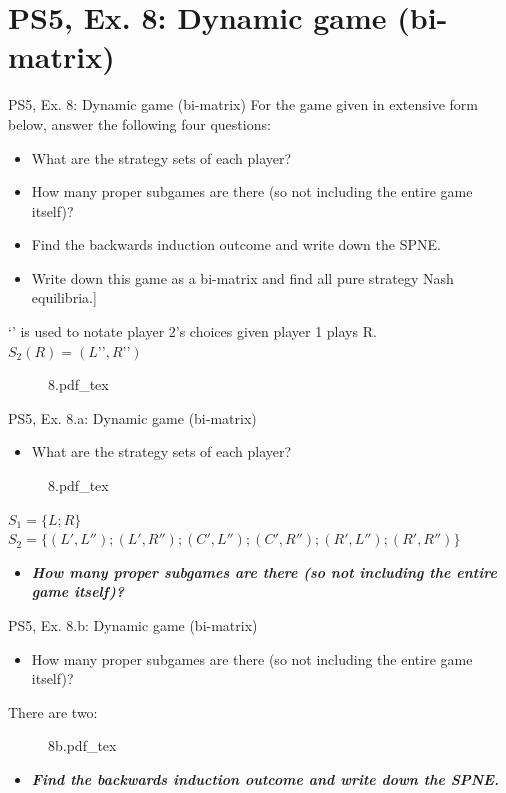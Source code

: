 \section{PS5, Ex. 8: Dynamic game (bi-matrix)}

\begin{frame}{PS5, Ex. 8: Dynamic game (bi-matrix)}
  For the game given in extensive form below, answer the following four questions:
  \begin{itemize}
    \item[(a)] What are the strategy sets of each player?
    \item[(b)] How many proper subgames are there (so not including the entire game itself)?
    \item[(c)] Find the backwards induction outcome and write down the SPNE.
    \item[(d)] Write down this game as a bi-matrix and find all pure strategy Nash equilibria.]
  \end{itemize}
    ‘’ is used to notate player 2’s choices given player 1 plays R. $S_2(R)=(L’’,R’’)$
  \begin{figure}[!h]
    \center
    \def\svgwidth{.8\columnwidth}
    {8.pdf_tex}
  \end{figure}
  \vfill\null
\end{frame}

\begin{frame}{PS5, Ex. 8.a: Dynamic game (bi-matrix)}
  \begin{itemize}
    \item[(a)] What are the strategy sets of each player?
  \end{itemize}
  \begin{figure}[!h]
    \center
    \def\svgwidth{.8\columnwidth}
    {8.pdf_tex}
  \end{figure}
  $S_1=\{L;R\}$\\
  $S_2=\{(L',L'');(L', R'');(C',L'');(C', R'');(R',L'');(R', R'')\}$
  \begin{itemize}
    \item[(b)] \textbf{\textit{How many proper subgames are there (so not including the entire game itself)?}}
  \end{itemize}
  \vfill\null
\end{frame}

\begin{frame}{PS5, Ex. 8.b: Dynamic game (bi-matrix)}
  \begin{itemize}
    \item[(b)] How many proper subgames are there (so not including the entire game itself)?
  \end{itemize}
  There are two:
  \begin{figure}[!h]
    \center
    \def\svgwidth{.9\columnwidth}
    {8b.pdf_tex}
  \end{figure}
  \begin{itemize}
    \item[(C)] \textbf{\textit{Find the backwards induction outcome and write down the SPNE.}}
  \end{itemize}
  \vfill\null
\end{frame}


